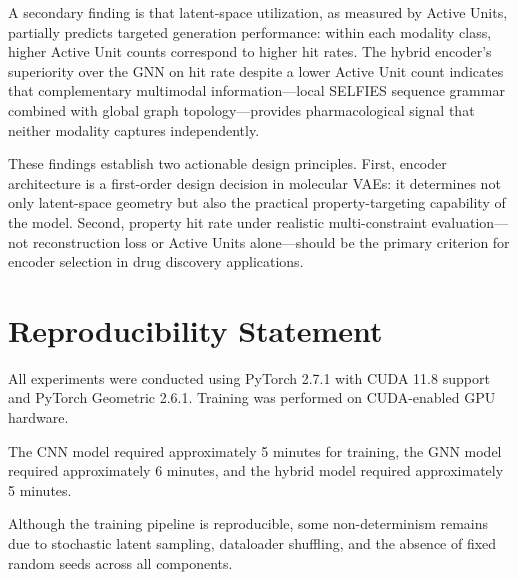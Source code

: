 \documentclass[conference]{IEEEtran}
\begin{document}
A secondary finding is that latent-space utilization, as measured by Active Units, partially predicts targeted generation performance: within each modality class, higher Active Unit counts correspond to higher hit rates. The hybrid encoder's superiority over the GNN on hit rate despite a lower Active Unit count indicates that complementary multimodal information---local SELFIES sequence grammar combined with global graph topology---provides pharmacological signal that neither modality captures independently.

These findings establish two actionable design principles. First, encoder architecture is a first-order design decision in molecular VAEs: it determines not only latent-space geometry but also the practical property-targeting capability of the model. Second, property hit rate under realistic multi-constraint evaluation---not reconstruction loss or Active Units alone---should be the primary criterion for encoder selection in drug discovery applications.

\section{Reproducibility Statement}

All experiments were conducted using PyTorch 2.7.1 with CUDA 11.8 support and PyTorch Geometric 2.6.1. Training was performed on CUDA-enabled GPU hardware.

The CNN model required approximately 5 minutes for training, the GNN model required approximately 6 minutes, and the hybrid model required approximately 5 minutes.

Although the training pipeline is reproducible, some non-determinism remains due to stochastic latent sampling, dataloader shuffling, and the absence of fixed random seeds across all components.
\end{document}
